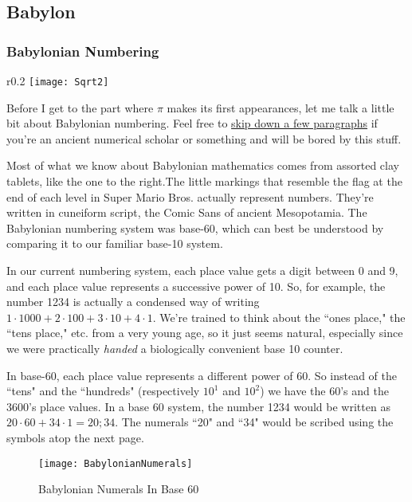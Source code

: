 \documentclass[11pt,titlepage]{article}
\begin{document}
\subsection*{Babylon} 

\subsubsection*{Babylonian Numbering}

\begin{wrapfigure}{r}{0.2\textwidth}
\centering
\vspace{-0.7cm}
\texttt{[image: Sqrt2]}
\end{wrapfigure}
Before I get to the part where $\pi$ makes its first appearances, let me talk a little bit about Babylonian numbering. Feel free to \hyperref[babylonpi]{skip down a few paragraphs} if you're an ancient numerical scholar or something and will be bored by this stuff. 

Most of what we know about Babylonian mathematics comes from assorted clay tablets, like the one to the right.The little markings that resemble the flag at the end of each level in Super Mario Bros. actually represent numbers. They're written in cuneiform script, the Comic Sans of ancient Mesopotamia. The Babylonian numbering system was base-60, which can best be understood by comparing it to our familiar base-10 system. 

In our current numbering system, each place value gets a digit between 0 and 9, and each place value represents a successive power of 10. So, for example, the number 1234 is actually a condensed way of writing $1\cdot 1000 + 2\cdot 100 + 3\cdot 10 + 4\cdot 1$. We're trained to think about the ``ones place," the ``tens place," etc. from a very young age, so it just seems natural, especially since we were practically \textit{handed} a biologically convenient base 10 counter.

In base-60, each place value represents a different power of 60. So instead of the ``tens" and the ``hundreds" (respectively $10^1$ and $10^2$) we have the $60$'s and the $3600$'s place values. In a base 60 system, the number 1234 would be written as $20\cdot 60 + 34\cdot 1 = 20;34$. The numerals ``20" and ``34" would be scribed using the symbols atop the next page.

\begin{figure}[h]
\centering
\texttt{[image: BabylonianNumerals]}
\caption{Babylonian Numerals In Base 60}
\end{figure}
\end{document}
